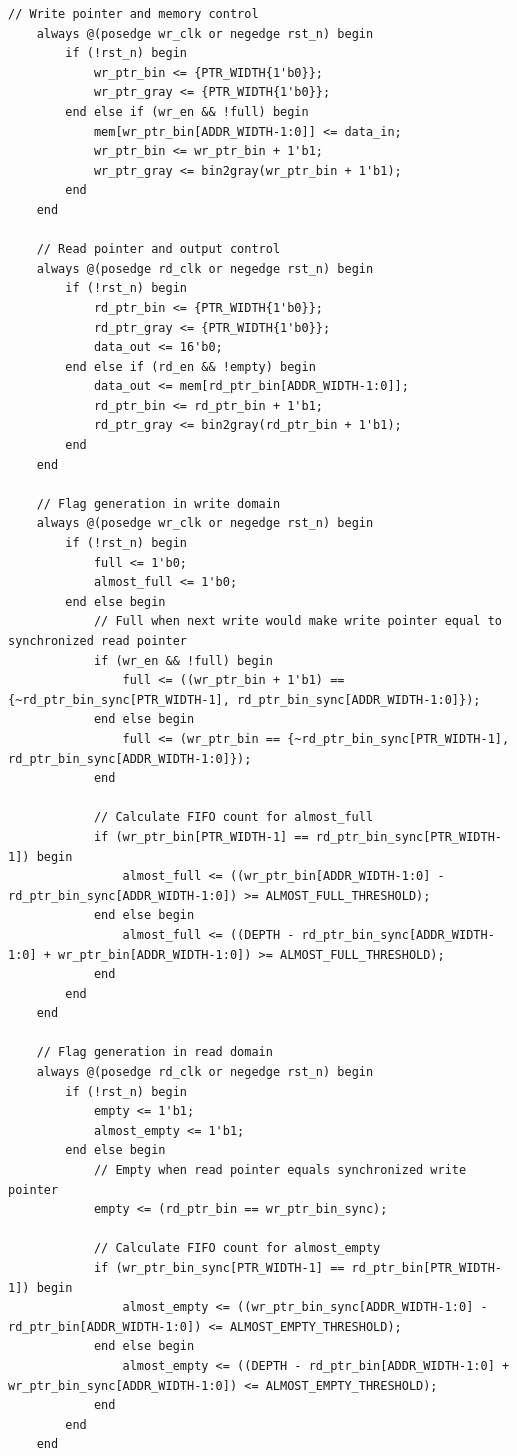 \documentclass[UTF8]{ctexart}
\begin{document}
\begin{lstlisting}[frame=shadowbox,caption=async\_fifo.v]
    // Write pointer and memory control
    always @(posedge wr_clk or negedge rst_n) begin
        if (!rst_n) begin
            wr_ptr_bin <= {PTR_WIDTH{1'b0}};
            wr_ptr_gray <= {PTR_WIDTH{1'b0}};
        end else if (wr_en && !full) begin
            mem[wr_ptr_bin[ADDR_WIDTH-1:0]] <= data_in;
            wr_ptr_bin <= wr_ptr_bin + 1'b1;
            wr_ptr_gray <= bin2gray(wr_ptr_bin + 1'b1);
        end
    end
    
    // Read pointer and output control
    always @(posedge rd_clk or negedge rst_n) begin
        if (!rst_n) begin
            rd_ptr_bin <= {PTR_WIDTH{1'b0}};
            rd_ptr_gray <= {PTR_WIDTH{1'b0}};
            data_out <= 16'b0;
        end else if (rd_en && !empty) begin
            data_out <= mem[rd_ptr_bin[ADDR_WIDTH-1:0]];
            rd_ptr_bin <= rd_ptr_bin + 1'b1;
            rd_ptr_gray <= bin2gray(rd_ptr_bin + 1'b1);
        end
    end
    
    // Flag generation in write domain
    always @(posedge wr_clk or negedge rst_n) begin
        if (!rst_n) begin
            full <= 1'b0;
            almost_full <= 1'b0;
        end else begin
            // Full when next write would make write pointer equal to synchronized read pointer
            if (wr_en && !full) begin
                full <= ((wr_ptr_bin + 1'b1) == {~rd_ptr_bin_sync[PTR_WIDTH-1], rd_ptr_bin_sync[ADDR_WIDTH-1:0]});
            end else begin
                full <= (wr_ptr_bin == {~rd_ptr_bin_sync[PTR_WIDTH-1], rd_ptr_bin_sync[ADDR_WIDTH-1:0]});
            end
            
            // Calculate FIFO count for almost_full
            if (wr_ptr_bin[PTR_WIDTH-1] == rd_ptr_bin_sync[PTR_WIDTH-1]) begin
                almost_full <= ((wr_ptr_bin[ADDR_WIDTH-1:0] - rd_ptr_bin_sync[ADDR_WIDTH-1:0]) >= ALMOST_FULL_THRESHOLD);
            end else begin
                almost_full <= ((DEPTH - rd_ptr_bin_sync[ADDR_WIDTH-1:0] + wr_ptr_bin[ADDR_WIDTH-1:0]) >= ALMOST_FULL_THRESHOLD);
            end
        end
    end
    
    // Flag generation in read domain
    always @(posedge rd_clk or negedge rst_n) begin
        if (!rst_n) begin
            empty <= 1'b1;
            almost_empty <= 1'b1;
        end else begin
            // Empty when read pointer equals synchronized write pointer
            empty <= (rd_ptr_bin == wr_ptr_bin_sync);
            
            // Calculate FIFO count for almost_empty
            if (wr_ptr_bin_sync[PTR_WIDTH-1] == rd_ptr_bin[PTR_WIDTH-1]) begin
                almost_empty <= ((wr_ptr_bin_sync[ADDR_WIDTH-1:0] - rd_ptr_bin[ADDR_WIDTH-1:0]) <= ALMOST_EMPTY_THRESHOLD);
            end else begin
                almost_empty <= ((DEPTH - rd_ptr_bin[ADDR_WIDTH-1:0] + wr_ptr_bin_sync[ADDR_WIDTH-1:0]) <= ALMOST_EMPTY_THRESHOLD);
            end
        end
    end
    

\end{lstlisting}
\end{document}
